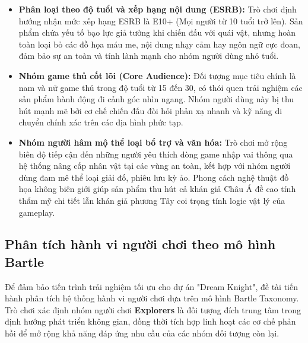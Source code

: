 \documentclass[../DoAn.tex]{subfiles}
\begin{document}
\begin{itemize}
    \item \textbf{Phân loại theo độ tuổi và xếp hạng nội dung (ESRB):} Trò chơi định hướng nhận mức xếp hạng ESRB là E10+ (Mọi người từ 10 tuổi trở lên). Sản phẩm chứa yếu tố bạo lực giả tưởng khi chiến đấu với quái vật, nhưng hoàn toàn loại bỏ các đồ họa máu me, nội dung nhạy cảm hay ngôn ngữ cực đoan, đảm bảo sự an toàn và tính lành mạnh cho nhóm người dùng nhỏ tuổi.
    \item \textbf{Nhóm game thủ cốt lõi (Core Audience):} Đối tượng mục tiêu chính là nam và nữ game thủ trong độ tuổi từ 15 đến 30, có thói quen trải nghiệm các sản phẩm hành động đi cảnh góc nhìn ngang. Nhóm người dùng này bị thu hút mạnh mẽ bởi cơ chế chiến đấu đòi hỏi phản xạ nhanh và kỹ năng di chuyển chính xác trên các địa hình phức tạp.
    \item \textbf{Nhóm người hâm mộ thể loại bổ trợ và văn hóa:} Trò chơi mở rộng biên độ tiếp cận đến những người yêu thích dòng game nhập vai thông qua hệ thống nâng cấp nhân vật tại các vùng an toàn, kết hợp với nhóm người dùng đam mê thể loại giải đố, phiêu lưu kỳ ảo. Phong cách nghệ thuật đồ họa không biên giới giúp sản phẩm thu hút cả khán giả Châu Á đề cao tính thẩm mỹ chi tiết lẫn khán giả phương Tây coi trọng tính logic vật lý của gameplay.
\end{itemize}


\subsection{Phân tích hành vi người chơi theo mô hình Bartle}
\label{subsection:1.3.1}

Để đảm bảo tiến trình trải nghiệm tối ưu cho dự án "Dream Knight", đề tài tiến hành phân tích hệ thống hành vi người chơi dựa trên mô hình Bartle Taxonomy. Trò chơi xác định nhóm người chơi \textbf{Explorers} là đối tượng đích trung tâm trong định hướng phát triển không gian, đồng thời tích hợp linh hoạt các cơ chế phản hồi để mở rộng khả năng đáp ứng nhu cầu của các nhóm đối tượng còn lại.
\end{document}
